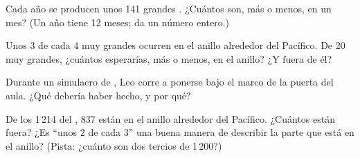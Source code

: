 \begin{exercise}[$\star\star$]\label{exo:g4:volcanoes-earthquakes-first-look:8}
Cada año se producen unos 141 grandes . ¿Cuántos son, más o
menos, en un mes? (Un año tiene 12 meses; da un número entero.)
\end{exercise}

\begin{exercise}[$\star\star$]\label{exo:g4:volcanoes-earthquakes-first-look:9}
Unos 3 de cada 4  muy grandes ocurren en el anillo alrededor del
Pacífico. De 20  muy grandes, ¿cuántos esperarías, más o menos,
en el anillo? ¿Y fuera de él?
\end{exercise}

\begin{exercise}[$\star\star$]\label{exo:g4:volcanoes-earthquakes-first-look:10}
Durante un simulacro de , Leo corre a ponerse bajo el marco de la
puerta del aula. ¿Qué debería haber hecho, y por qué?
\end{exercise}

\begin{exercise}[$\star\star\star$]\label{exo:g4:volcanoes-earthquakes-first-look:11}
De los 1\,214  del , 837 están en el anillo alrededor del
Pacífico. ¿Cuántos están fuera? ¿Es ``unos 2 de cada 3'' una buena manera de
describir la parte que está en el anillo? (Pista: ¿cuánto son dos tercios
de 1\,200?)
\end{exercise}
